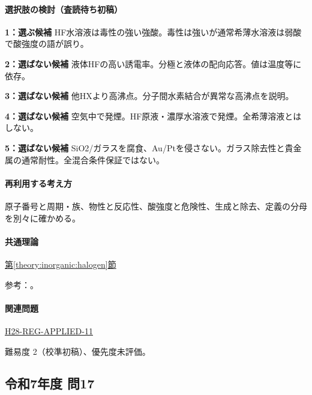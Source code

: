 \paragraph{選択肢の検討（査読待ち初稿）}\mbox{}\par

\noindent\textbf{1：選ぶ候補} HF水溶液は毒性の強い強酸。毒性は強いが通常希薄水溶液は弱酸で酸強度の語が誤り。\par

\noindent\textbf{2：選ばない候補} 液体HFの高い誘電率。分極と液体の配向応答。値は温度等に依存。\par

\noindent\textbf{3：選ばない候補} 他HXより高沸点。分子間水素結合が異常な高沸点を説明。\par

\noindent\textbf{4：選ばない候補} 空気中で発煙。HF原液・濃厚水溶液で発煙。全希薄溶液とはしない。\par

\noindent\textbf{5：選ばない候補} SiO2/ガラスを腐食、Au/Ptを侵さない。ガラス除去性と貴金属の通常耐性。全混合条件保証ではない。\par

\paragraph{再利用する考え方} 原子番号と周期・族、物性と反応性、酸強度と危険性、生成と除去、定義の分母を別々に確かめる。

\paragraph{共通理論} \hyperref[theory:inorganic:halogen]{第\ref*{theory:inorganic:halogen}節}

\par 参考：\cite{niosh_hf,yale_hydrohalic}。

\paragraph{関連問題} \hyperref[q:h28-reg-applied-11]{H28-REG-APPLIED-11}

\par 難易度 2（校準初稿）、優先度未評価。

\subsection{令和7年度 問17}
\label{q:r07-reg-applied-17}

